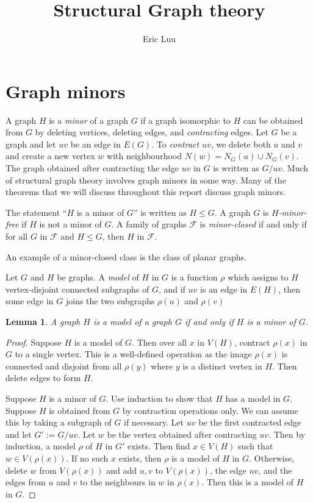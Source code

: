 \documentclass[]{article}
\title{Structural Graph theory}
\author{Eric Luu}
\newtheorem{lemma}[theorem]{Lemma}
\theoremstyle{definition}
\numberwithin{theorem}{section}
\numberwithin{equation}{section}
\begin{document}
\maketitle

\section{Graph minors}
A graph \(H\) is a \textit{minor} of a graph \(G\) if a graph isomorphic to \(H\) can be obtained from \(G\) by deleting vertices, deleting edges, and \textit{contracting} edges. Let $G$ be a graph and let $uv$ be an edge in $E(G)$. To \textit{contract} \(uv\), we delete both \(u\) and \(v\) and create a new vertex \(w\) with neighbourhood \(N(w) = N_G(u) \cup N_G(v)\). The graph obtained after contracting the edge \(uv\) in $G$ is written as \(G/uv\). Much of structural graph theory involves graph minors in some way. Many of the theorems that we will discuss throughout this report discuss graph minors. 

The statement ``\(H\) is a minor of \(G\)'' is written as \(H \leq G\). A graph \(G\) is \textit{\(H\)-minor-free} if $H$ is not a minor of $G$. A family of graphs \(\mathcal{F}\) is \textit{minor-closed} if and only if for all $G$ in \(\mathcal{F}\) and \(H \leq G\), then $H$ in \(\mathcal{F}\).

An example of a minor-closed class is the class of planar graphs.

Let $G$ and $H$ be graphs. A \textit{model} of \(H\) in \(G\) is a function $\rho$ which assigns to \(H\) vertex-disjoint connected subgraphs of \(G\), and if $uv$ is an edge in \(E(H)\), then some edge in \(G\) joins the two subgraphs \(\rho(u)\) and \(\rho(v)\)

\begin{lemma}
	A graph \(H\) is a model of a graph \(G\) if and only if $H$ is a minor of $G$.
\end{lemma}

\begin{proof}
	Suppose \(H\) is a model of \(G\). Then over all \(x\) in \(V(H)\), contract \(\rho(x)\) in \(G\) to a single vertex. This is a well-defined operation as the image $\rho(x)$ is connected and disjoint from all $\rho(y)$ where $y$ is a distinct vertex in $H$. Then delete edges to form \(H\).

	Suppose $H$ is a minor of $G$. Use induction to show that \(H\) has a model in \(G\). Suppose \(H\) is obtained from \(G\) by contraction operations only. We can assume this by taking a subgraph of \(G\) if necessary. Let \(uv\) be the first contracted edge and let \(G' := G / uv\). Let \(w\) be the vertex obtained after contracting \(uv\). Then by induction, a model \(\rho\) of \(H\) in \(G'\) exists. Then find $x \in V(H)$ such that $w \in V(\rho(x))$. If no such $x$ exists, then $\rho$ is a model of $H$ in $G$. Otherwise, delete \(w\) from \(V(\rho(x)) \) and add $u, v$ to $V(\rho(x))$, the edge $uv$, and the edges from $u$ and $v$ to the neighbours in $w$ in $\rho(x)$. Then this is a model of \(H\) in \(G\). 
\end{proof}
\end{document}

